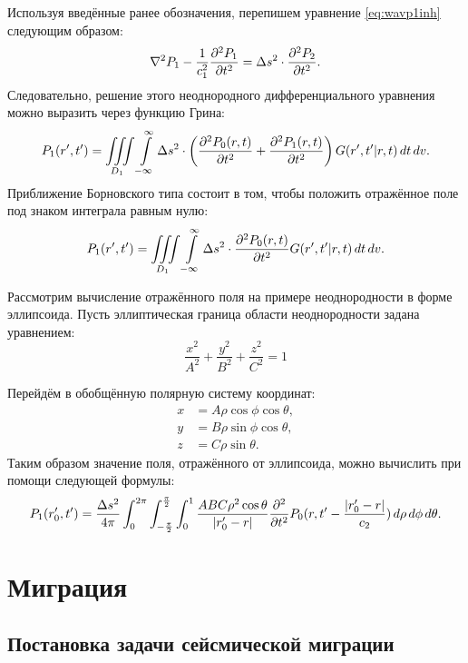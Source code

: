 \documentclass[a4paper, fontsize=14pt]{article}
\begin{document}
	Используя введённые ранее обозначения, перепишем уравнение \eqref{eq:wavp1inh} следующим образом:
	\begin{equation}
		\nabla^2 P_1 - \frac{1}{c_1^2}\diff[2]{P_1}{t}  = \Delta s^2 \cdot \diff[2]{P_2}{t}.
	\end{equation}
	Следовательно, решение этого неоднородного дифференциального уравнения можно выразить через функцию Грина:
	\begin{equation}
		P_1(r',t')   = \iiint\limits_{D_1} \int\limits_{-\infty}^{\infty} \Delta s^2 \cdot \left(\diff[2]{P_0(r,t)}{t}+\diff[2]{P_1(r,t)}{t}\right) G(r',t'|r,t)\, dt \, dv.
	\end{equation}
	Приближение Борновского типа состоит в том, чтобы положить отражённое поле под знаком интеграла равным нулю:
	\begin{equation}
		P_1(r',t')   = \iiint\limits_{D_1} \int\limits_{-\infty}^{\infty} \Delta s^2 \cdot 	\diff[2]{P_0(r,t)}{t} G(r',t'|r,t)\, dt \, dv.
	\end{equation}
	
	Рассмотрим вычисление отражённого поля на примере неоднородности в форме эллипсоида. Пусть эллиптическая граница области неоднородности задана уравнением:
	\begin{equation}
		\frac{x^2}{A^2} + \frac{y^2}{B^2} + \frac{z^2}{C^2} = 1
	\end{equation}
	
	Перейдём в обобщённую полярную систему координат:
	\begin{align*}
		x &= A \rho \cos \phi \cos \theta, \\
		y &= B \rho \sin \phi \cos \theta, \\
		z &= C \rho \sin \theta. 
	\end{align*}
	Таким образом значение поля, отражённого от эллипсоида, можно вычислить при помощи следующей формулы:
	\begin{equation*}
		P_1(r_0',t') = \frac{\Delta s^2}{4\pi} \int_{0}^{2\pi} \int_{-\frac{\pi}{2}}^{\frac{\pi}{2}} \int_{0}^{1} \frac{ABC \rho^2 \cos \theta}{|r_0'-r|} \diff[2]{}{t}P_0(r,t' - \frac{|r_0'-r|}{c_2}) \,d\rho \, d\phi \, d \theta.
	\end{equation*}
	
	
	\section{Миграция}
	\subsection{Постановка задачи сейсмической миграции}
	
\end{document}
